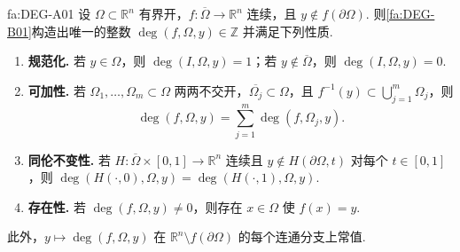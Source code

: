 \begin{FATheorem}{fa:DEG-A01}
设 \(\displaystyle\Omega\subset\mathbb R^n\) 有界开，\(\displaystyle f:\overline\Omega\to\mathbb R^n\) 连续，且 \(\displaystyle y\notin f(\partial\Omega)\). 则\autoref{fa:DEG-B01}构造出唯一的整数
\(\displaystyle \deg(f,\Omega,y)\in\mathbb Z\)
并满足下列性质.

\begin{enumerate}
\item \textbf{规范化.} 若 \(\displaystyle y\in\Omega\)，则 \(\displaystyle\deg(I,\Omega,y)=1\)；若 \(\displaystyle y\notin\overline\Omega\)，则 \(\displaystyle\deg(I,\Omega,y)=0\).
\item \textbf{可加性.} 若 \(\displaystyle\Omega_1,\dots,\Omega_m\subset\Omega\) 两两不交开，\(\displaystyle\overline{\Omega_j}\subset\Omega\)，且 \(\displaystyle f^{-1}(y)\subset\bigcup_{j=1}^m\Omega_j\)，则
\[
\deg(f,\Omega,y)
=
\sum_{j=1}^m\deg(f,\Omega_j,y).
\]
\item \textbf{同伦不变性.} 若 \(\displaystyle H:\overline\Omega\times[0,1]\to\mathbb R^n\) 连续且 \(\displaystyle y\notin H(\partial\Omega,t)\) 对每个 \(\displaystyle t\in[0,1]\)，则
\(\displaystyle \deg(H(\cdot,0),\Omega,y) = \deg(H(\cdot,1),\Omega,y).\)
\item \textbf{存在性.} 若 \(\displaystyle\deg(f,\Omega,y)\neq0\)，则存在 \(\displaystyle x\in\Omega\) 使 \(\displaystyle f(x)=y\).
\end{enumerate}
此外，\(\displaystyle y\mapsto\deg(f,\Omega,y)\) 在 \(\displaystyle\mathbb R^n\setminus f(\partial\Omega)\) 的每个连通分支上常值.
\end{FATheorem}

